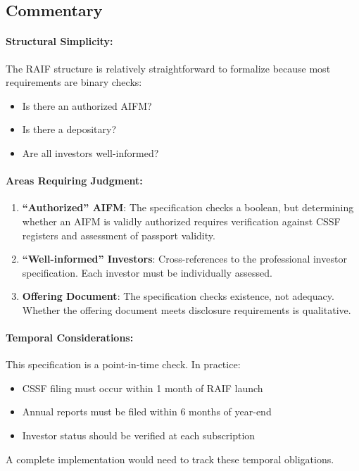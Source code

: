 \subsection{Commentary}
\label{sec:raif-commentary}

\paragraph{Structural Simplicity:} The RAIF structure is relatively straightforward to formalize because most requirements are binary checks:
\begin{itemize}
  \item Is there an authorized AIFM?
  \item Is there a depositary?
  \item Are all investors well-informed?
\end{itemize}

\paragraph{Areas Requiring Judgment:}
\begin{enumerate}
  \item \textbf{``Authorized'' AIFM}: The specification checks a boolean, but determining whether an AIFM is validly authorized requires verification against CSSF registers and assessment of passport validity.
  \item \textbf{``Well-informed'' Investors}: Cross-references to the professional investor specification. Each investor must be individually assessed.
  \item \textbf{Offering Document}: The specification checks existence, not adequacy. Whether the offering document meets disclosure requirements is qualitative.
\end{enumerate}

\paragraph{Temporal Considerations:} This specification is a point-in-time check. In practice:
\begin{itemize}
  \item CSSF filing must occur within 1 month of RAIF launch
  \item Annual reports must be filed within 6 months of year-end
  \item Investor status should be verified at each subscription
\end{itemize}

A complete implementation would need to track these temporal obligations.
